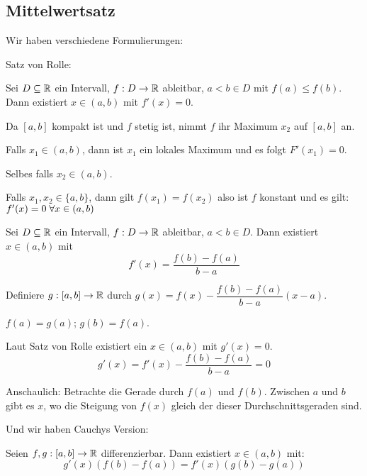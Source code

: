 \documentclass[main.tex]{subfiles}
\begin{document}
\subsection{Mittelwertsatz}

Wir haben verschiedene Formulierungen:

Satz von Rolle:
\begin{Theorem}[Mittelwertsatz]
  Sei $D \subseteq \mathbb{R}$ ein Intervall, $f : D \to \mathbb{R}$ ableitbar, $a<b \in D$ mit $f(a) \leq f(b)$. Dann existiert $x \in (a,b)$ mit $f'(x) = 0$.
\end{Theorem}

\begin{Beweis}
  Da $[a,b]$ kompakt ist und $f$ stetig ist, nimmt $f$ ihr Maximum $x_2$ auf $[a,b]$ an.

  Falls $x_1 \in (a,b)$, dann ist $x_1$ ein lokales Maximum und es folgt $F'(x_1) = 0$.

  Selbes falls $x_2 \in (a,b)$.

  Falls $x_1,x_2 \in \{a,b\}$, dann gilt $f(x_1) = f(x_2)$ also ist $f$ konstant und es gilt: $f'(x) = 0 \;\forall x \in (a,b)$
\end{Beweis}

\begin{Korollar}[Mittelwertsatz]
  Sei $D \subseteq \mathbb{R}$ ein Intervall, $f : D \to \mathbb{R}$ ableitbar, $a < b \in D$. Dann existiert $x \in (a,b)$ mit
  $$f'(x) = \dfrac{f(b)-f(a)}{b-a}$$
\end{Korollar}

\begin{Beweis}
  Definiere $g : [a,b] \to \mathbb{R}$ durch $g(x) = f(x) - \dfrac{f(b)-f(a)}{b-a} (x - a)$.

  $f(a) = g(a)$; $g(b) = f(a)$.

  Laut Satz von Rolle existiert ein $x \in (a,b)$ mit $g'(x) = 0$.
  $$g'(x) = f'(x) - \dfrac{f(b)-f(a)}{b-a} = 0$$
  \begin{Bemerkung}
    Anschaulich: Betrachte die Gerade durch $f(a)$ und $f(b)$. Zwischen $a$ und $b$ gibt es $x$, wo die Steigung von $f(x)$ gleich der dieser Durchschnittsgeraden sind.
  \end{Bemerkung}
\end{Beweis}

Und wir haben Cauchys Version:
\begin{Korollar}[Mittelwertsatz]
  Seien $f,g : [a,b] \to \mathbb{R}$ differenzierbar. Dann existiert $x \in (a,b)$ mit:
  $$g'(x)(f(b) - f(a)) = f'(x)(g(b) - g(a))$$
\end{Korollar}
\end{document}
